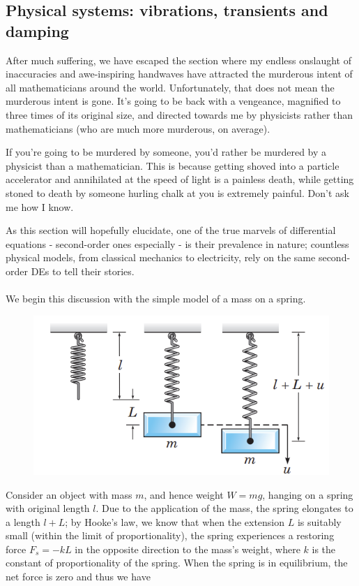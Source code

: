 \documentclass{article}
\begin{document}
\subsection{Physical systems: vibrations, transients and damping}
After much suffering, we have escaped the section where my endless onslaught of inaccuracies and awe-inspiring handwaves have attracted the murderous intent of all mathematicians around the world. Unfortunately, that does not mean the murderous intent is gone. It's going to be back with a vengeance, magnified to three times of its original size, and directed towards me by physicists rather than mathematicians (who are much more murderous, on average). 
\begin{theorem}
    If you're going to be murdered by someone, you'd rather be murdered by a physicist than a mathematician. This is because getting shoved into a particle accelerator and annihilated at the speed of light is a painless death, while getting stoned to death by someone hurling chalk at you is extremely painful. Don't ask me how I know.
\end{theorem}
As this section will hopefully elucidate, one of the true marvels of differential equations - second-order ones especially - is their prevalence in nature; countless physical models, from classical mechanics to electricity, rely on the same second-order DEs to tell their stories. \\ \\ 
We begin this discussion with the simple model of a mass on a spring. 
\begin{figure}[h]
    \centering
    \includegraphics[width=12cm]{DE-ch3-3.6.png}
\end{figure}
Consider an object with mass $m$, and hence weight $W=mg$, hanging on a spring with original length $l$. Due to the application of the mass, the spring elongates to a length $l + L$; by Hooke's law, we know that when the extension $L$ is suitably small (within the limit of proportionality), the spring experiences a restoring force $F_s = -kL$ in the opposite direction to the mass's weight, where $k$ is the constant of proportionality of the spring. When the spring is in equilibrium, the net force is zero and thus we have
\end{document}

